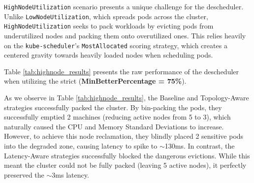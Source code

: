 \texttt{HighNodeUtilization} scenario presents a unique challenge for the descheduler. Unlike \texttt{LowNodeUtilization}, which spreads pods across the cluster, \texttt{HighNodeUtilization} seeks to pack workloads by evicting pods from underutilized nodes and packing them onto overutilized ones. This relies heavily on the \texttt{kube-scheduler}'s \texttt{MostAllocated} scoring strategy, which creates a centered gravity towards heavily loaded nodes when scheduling pods.

Table \ref{tab:highnode_results} presents the raw performance of the descheduler when utilizing the strict (\textbf{MinBetterPercentage = 75\%}).
\begin{table}[tbp]
    \centering
    \caption{Descheduler Performance: HighNodeUtilization Scenario}
    \label{tab:highnode_results}
\end{table}

As we observe in Table \ref{tab:highnode_results}, the Baseline and Topology-Aware strategies successfully packed the cluster. By bin-packing the pods, they successfully emptied 2 machines (reducing active nodes from 5 to 3), which naturally caused the CPU and Memory Standard Deviations to increase. However, to achieve this node reclamation, they blindly placed 2 sensitive pods into the degraded zone, causing latency to spike to $\sim$130ms. In contrast, the Latency-Aware strategies successfully blocked the dangerous evictions. While this meant the cluster could not be fully packed (leaving 5 active nodes), it perfectly preserved the $\sim$3ms latency.

